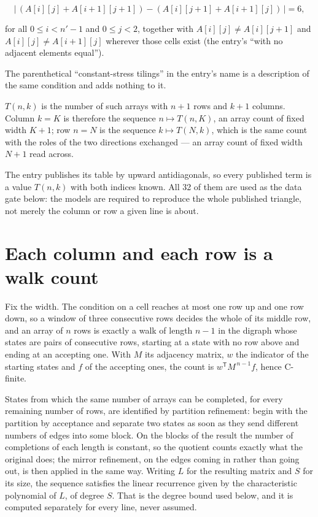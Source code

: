 \documentclass[11pt]{article}
\theoremstyle{definition}
\begin{document}
\[\bigl|\,(A[i][j] + A[i{+}1][j{+}1]) - (A[i][j{+}1] + A[i{+}1][j])\,\bigr| = 6,\]

for all $0 \le i < n'-1$ and $0 \le j < 2$, together with $A[i][j] \ne A[i][j{+}1]$ and $A[i][j] \ne A[i{+}1][j]$ wherever those cells exist (the entry's ``with no adjacent elements equal'').

The parenthetical ``constant-stress tilings'' in the entry's name is a description of the same condition and adds nothing to it.

$T(n,k)$ is the number of such arrays with $n + 1$ rows and $k + 1$ columns. Column $k = K$ is therefore the sequence $n \mapsto T(n,K)$, an array count of fixed width $K + 1$; row $n = N$ is the sequence $k \mapsto T(N,k)$, which is the same count with the roles of the two directions exchanged --- an array count of fixed width $N + 1$ read across.

The entry publishes its table by upward antidiagonals, so every published term is a value $T(n,k)$ with both indices known. All 32 of them are used as the data gate below: the models are required to reproduce the whole published triangle, not merely the column or row a given line is about.

\section{Each column and each row is a walk count}

Fix the width. The condition on a cell reaches at most one row up and one row down, so a window of three consecutive rows decides the whole of its middle row, and an array of $n$ rows is exactly a walk of length $n-1$ in the digraph whose states are pairs of consecutive rows, starting at a state with no row above and ending at an accepting one. With $M$ its adjacency matrix, $w$ the indicator of the starting states and $f$ of the accepting ones, the count is $w^{\mathsf T}M^{\,n-1}f$, hence C-finite.

States from which the same number of arrays can be completed, for every remaining number of rows, are identified by partition refinement: begin with the partition by acceptance and separate two states as soon as they send different numbers of edges into some block. On the blocks of the result the number of completions of each length is constant, so the quotient counts exactly what the original does; the mirror refinement, on the edges coming in rather than going out, is then applied in the same way. Writing $L$ for the resulting matrix and $S$ for its size, the sequence satisfies the linear recurrence given by the characteristic polynomial of $L$, of degree $S$. That is the degree bound used below, and it is computed separately for every line, never assumed.
\end{document}
